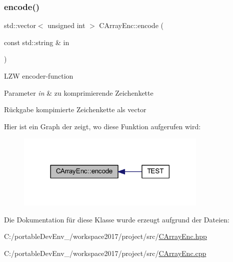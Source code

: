 \subsubsection{\texorpdfstring{encode()}{encode()}}
{\footnotesize\ttfamily std\+::vector$<$ unsigned int $>$ C\+Array\+Enc\+::encode (\begin{DoxyParamCaption}\item[{const std\+::string \&}]{in }\end{DoxyParamCaption})}

L\+ZW encoder-\/function 
\begin{DoxyParams}{Parameter}
{\em in} & zu komprimierende Zeichenkette \\
\hline
\end{DoxyParams}
\begin{DoxyReturn}{Rückgabe}
kompimierte Zeichenkette als vector 
\end{DoxyReturn}
Hier ist ein Graph der zeigt, wo diese Funktion aufgerufen wird\+:
\nopagebreak
\begin{figure}[H]
\begin{center}
\leavevmode
\includegraphics[width=258pt]{class_c_array_enc_a51984cee678c54c93caf73aa82b596cc_icgraph}
\end{center}
\end{figure}


Die Dokumentation für diese Klasse wurde erzeugt aufgrund der Dateien\+:\begin{DoxyCompactItemize}
\item 
C\+:/portable\+Dev\+Env\+\_/workspace2017/project/src/\hyperlink{_c_array_enc_8hpp}{C\+Array\+Enc.\+hpp}\item 
C\+:/portable\+Dev\+Env\+\_/workspace2017/project/src/\hyperlink{_c_array_enc_8cpp}{C\+Array\+Enc.\+cpp}\end{DoxyCompactItemize}
